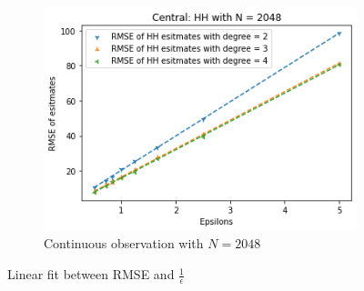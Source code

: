 \documentclass[11pt]{article}
\theoremstyle{definition}
\begin{document}
\begin{figure}[H]
\begin{subfigure}[b]{0.3\textwidth}
         \centering
         \includegraphics[width=\textwidth]{figures/hh_cen_epsi/hh_N_lin=2048.png}
         \caption{Continuous observation with $N=2048$}
         \label{fig:c3}
     \end{subfigure}
        \caption{Linear fit between RMSE and $\frac{1}{\epsilon}$}
        \label{fig:esp_cen_hh_2}
\end{figure}
\end{document}
